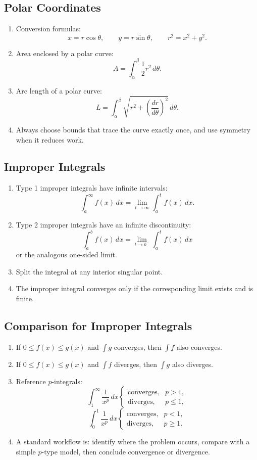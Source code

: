 \documentclass[11pt]{article}
\begin{document}
\subsection{Polar Coordinates}
\begin{enumerate}
  \item Conversion formulas:
  \[
  x=r\cos\theta,\qquad y=r\sin\theta,\qquad r^2=x^2+y^2.
  \]
  \item Area enclosed by a polar curve:
  \[
  A=\int_\alpha^\beta \frac12 r^2\,d\theta.
  \]
  \item Arc length of a polar curve:
  \[
  L=\int_\alpha^\beta \sqrt{r^2+\left(\frac{dr}{d\theta}\right)^2}\,d\theta.
  \]
  \item Always choose bounds that trace the curve exactly once, and use symmetry when it reduces work.
\end{enumerate}

\subsection{Improper Integrals}
\begin{enumerate}
  \item Type 1 improper integrals have infinite intervals:
  \[
  \int_a^\infty f(x)\,dx=\lim_{t\to\infty}\int_a^t f(x)\,dx.
  \]
  \item Type 2 improper integrals have an infinite discontinuity:
  \[
  \int_a^b f(x)\,dx=\lim_{t\to b^-}\int_a^t f(x)\,dx
  \]
  or the analogous one-sided limit.
  \item Split the integral at any interior singular point.
  \item The improper integral converges only if the corresponding limit exists and is finite.
\end{enumerate}

\subsection{Comparison for Improper Integrals}
\begin{enumerate}
  \item If $0\le f(x)\le g(x)$ and $\int g$ converges, then $\int f$ also converges.
  \item If $0\le f(x)\le g(x)$ and $\int f$ diverges, then $\int g$ also diverges.
  \item Reference $p$-integrals:
  \[
  \int_1^\infty \frac{1}{x^p}\,dx
  \begin{cases}
  \text{converges}, & p>1,\\
  \text{diverges}, & p\le 1,
  \end{cases}
  \]
  \[
  \int_0^1 \frac{1}{x^p}\,dx
  \begin{cases}
  \text{converges}, & p<1,\\
  \text{diverges}, & p\ge 1.
  \end{cases}
  \]
  \item A standard workflow is: identify where the problem occurs, compare with a simple $p$-type model, then conclude convergence or divergence.
\end{enumerate}
\end{document}
